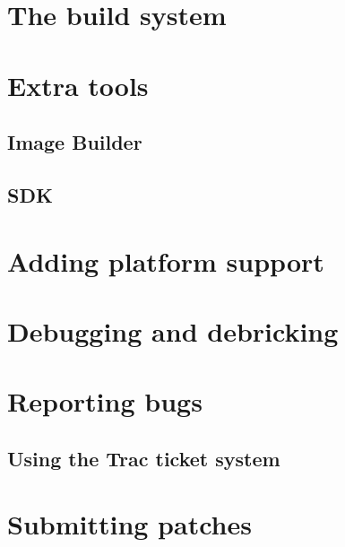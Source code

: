 \documentclass[a4paper]{book}
\begin{document}
  \section{The build system}
    
  \section{Extra tools}
    \subsection{Image Builder}
    \subsection{SDK}
  \section{Adding platform support}
     
  \section{Debugging and debricking}
     
   \section{Reporting bugs}
	\subsection{Using the Trac ticket system}
	
   \section{Submitting patches}
    
\end{document}
